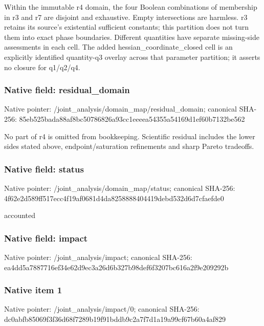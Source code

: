 \documentclass[10pt,a4paper]{article}
\begin{document}
\begingroup\raggedright\sloppy Within the immutable r4 domain,\allowbreak{} the four Boolean combinations of membership in r3 and r7 are disjoint and exhaustive. Empty intersections are harmless. r3 retains its source's existential sufficient constants;\allowbreak{} this partition does not turn them into exact phase boundaries. Different quantities have separate missing-side assessments in each cell. The added hessian\_\allowbreak{}coordinate\_\allowbreak{}closed cell is an explicitly identified quantity-q3 overlay across that parameter partition;\allowbreak{} it asserts no closure for q1/\allowbreak{}q2/\allowbreak{}q4.\par\endgroup

\subsubsection{Native field: residual\_\allowbreak{}domain}
Native pointer: /joint\_\allowbreak{}analysis/domain\_\allowbreak{}map/residual\_\allowbreak{}domain; canonical SHA-256: 85eb525bada88af8bc50786826a93cc1eeeea54355a54169d1ef60b7132be562

\begingroup\raggedright\sloppy No part of r4 is omitted from bookkeeping. Scientific residual includes the lower sides stated above,\allowbreak{} endpoint/\allowbreak{}saturation refinements and sharp Pareto tradeoffs.\par\endgroup

\subsubsection{Native field: status}
Native pointer: /joint\_\allowbreak{}analysis/domain\_\allowbreak{}map/status; canonical SHA-256: 4f62e2d589ff517ecc4f19af0681d4da8258888404419debd532d6d7cfaefde0

\begingroup\raggedright\sloppy accounted\par\endgroup

\subsubsection{Native field: impact}
Native pointer: /joint\_\allowbreak{}analysis/impact; canonical SHA-256: ea4dd5a7887716ef34e62d9ec3a26d6b327b98def6f3207bc616a2f9e209292b

\subsubsection{Native item 1}
Native pointer: /joint\_\allowbreak{}analysis/impact/0; canonical SHA-256: dc0abfb85069f3f36d68f7289b19f91bddb9c2a7f7d1a19a99cf67b60a4af829
\end{document}
